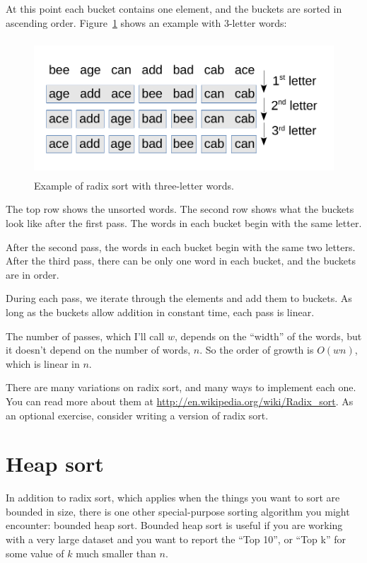 \documentclass[12pt]{book}
\theoremstyle{exercise}
\begin{document}
At this point each bucket contains one element, and the buckets are
sorted in ascending order. Figure~\ref{fig-sort3}
shows an example with
3-letter words:

\begin{figure}
\centering
\includegraphics[height=2.0in]{figs/radix_sort1.pdf}
\caption{Example of radix sort with three-letter words.}
\label{fig-sort3}
\end{figure}

The top row shows the unsorted words. The second row shows what the
buckets look like after the first pass. The words in each bucket begin
with the same letter.

After the second pass, the words in each bucket begin with the same two
letters. After the third pass, there can be only one word in each
bucket, and the buckets are in order.

During each pass, we iterate through the elements and add them to
buckets. As long as the buckets allow addition in constant time, each
pass is linear.

The number of passes, which I'll call $w$, depends on the ``width''
of the words, but it doesn't depend on the number of words, $n$.
So the order of growth is $O(wn)$, which is linear in $n$.

There are many variations on radix sort, and many ways to implement
each one. You can read more about them at
\url{http://en.wikipedia.org/wiki/Radix_sort}. As an optional
exercise, consider writing a version of radix sort.


\section{Heap sort}
\label{heap-sort}

In addition to radix sort, which applies when the things you want to
sort are bounded in size, there is one other special-purpose sorting
algorithm you might encounter: bounded heap sort. Bounded heap sort is
useful if you are working with a very large dataset and you want to
report the ``Top 10'', or ``Top k'' for some value of $k$ much
smaller than $n$.
\end{document}
